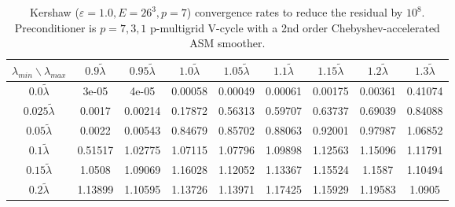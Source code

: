 \begin{table}
\centering
\begin{tabular}{||c| c c c c c c c c||}
  \hline
  $\lambda_{min}\backslash \lambda_{max}$ & $0.9 \tilde\lambda$ & $0.95 \tilde\lambda$ & $1.0 \tilde\lambda$ & $1.05 \tilde\lambda$ & $1.1 \tilde\lambda$ & $1.15 \tilde\lambda$ & $1.2 \tilde\lambda$ & $1.3 \tilde\lambda$  \\ 
\hline\hline
$0.0 \tilde\lambda$ & 3e-05 & 4e-05 & 0.00058 & 0.00049 & 0.00061 & 0.00175 & 0.00361 & 0.41074 \\ 
$0.025 \tilde\lambda$ & 0.0017 & 0.00214 & 0.17872 & 0.56313 & 0.59707 & 0.63737 & 0.69039 & 0.84088 \\ 
$0.05 \tilde\lambda$ & 0.0022 & 0.00543 & 0.84679 & 0.85702 & 0.88063 & 0.92001 & 0.97987 & 1.06852 \\ 
$0.1 \tilde\lambda$ & 0.51517 & 1.02775 & 1.07115 & 1.07796 & 1.09898 & 1.12563 & 1.15096 & 1.11791 \\ 
$0.15 \tilde\lambda$ & 1.0508 & 1.09069 & 1.16028 & 1.12052 & 1.13367 & 1.15524 & 1.1587 & 1.10494 \\ 
$0.2 \tilde\lambda$ & 1.13899 & 1.10595 & 1.13726 & 1.13971 & 1.17425 & 1.15929 & 1.19583 & 1.0905 \\ 
\hline
\end{tabular}
\caption{
  Kershaw ($\varepsilon=1.0, E=26^3, p=7$) convergence rates to reduce the residual by $10^8$.
  Preconditioner is $p=7,3,1$ p-multigrid V-cycle with a 2nd order Chebyshev-accelerated ASM smoother.
  \label{table:kershaw-eig-multiplier-conv-1.0}}
\end{table}
